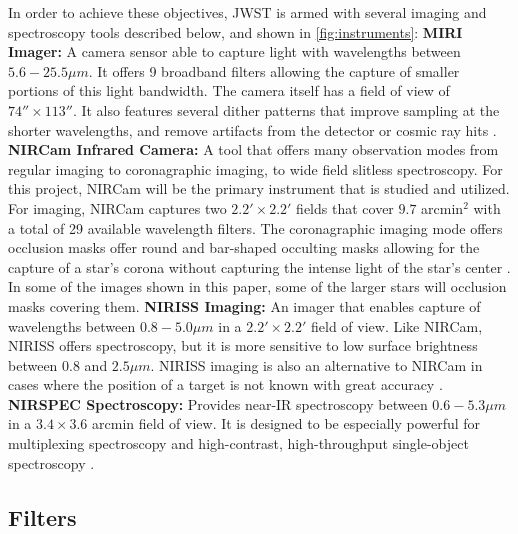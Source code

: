 \documentclass[10pt,twocolumn,letterpaper]{article}
\begin{document}
In order to achieve these objectives, JWST is armed with several imaging and spectroscopy tools described below, and shown in \cref{fig:instruments}:
\newline
\textbf{MIRI Imager:} A camera sensor able to capture light with wavelengths between $5.6 - 25.5\mu m$. It offers 9 broadband filters allowing the capture of smaller portions of this light bandwidth. 
The camera itself has a field of view of $74'' \times 113''$. It also features several dither patterns that improve sampling at the shorter wavelengths, and remove artifacts from the detector or cosmic ray hits \cite{webbmiri}.
\newline
\textbf{NIRCam Infrared Camera:} A tool that offers many observation modes from regular imaging to coronagraphic imaging, to wide field slitless spectroscopy. For this project, NIRCam will be the primary instrument that is studied and utilized.
For imaging, NIRCam captures two $2.2' \times 2.2'$ fields that cover $9.7$ arcmin$^2$ with a total of 29 available wavelength filters.
The coronagraphic imaging mode offers occlusion masks offer round and bar-shaped occulting masks allowing for the capture of a star's corona without capturing the intense light of the star's center \cite{webbnircam}. In some of the images shown in this paper, some of the larger stars will occlusion masks covering them.
\newline
\textbf{NIRISS Imaging:} An imager that enables capture of wavelengths between $0.8 - 5.0\mu m$ in a $2.2' \times 2.2'$ field of view. 
Like NIRCam, NIRISS offers spectroscopy, but it is more sensitive to low surface brightness between $0.8$ and $2.5\mu m$. 
NIRISS imaging is also an alternative to NIRCam in cases where the position of a target is not known with great accuracy \cite{webbniriss}.
\newline
\textbf{NIRSPEC Spectroscopy:} Provides near-IR spectroscopy between $0.6 - 5.3 \mu m$ in a $3.4 \times 3.6$ arcmin field of view. It is designed to be especially powerful for multiplexing spectroscopy and high-contrast, high-throughput single-object spectroscopy \cite{webbnirspec}.

\subsection{Filters}
\end{document}
